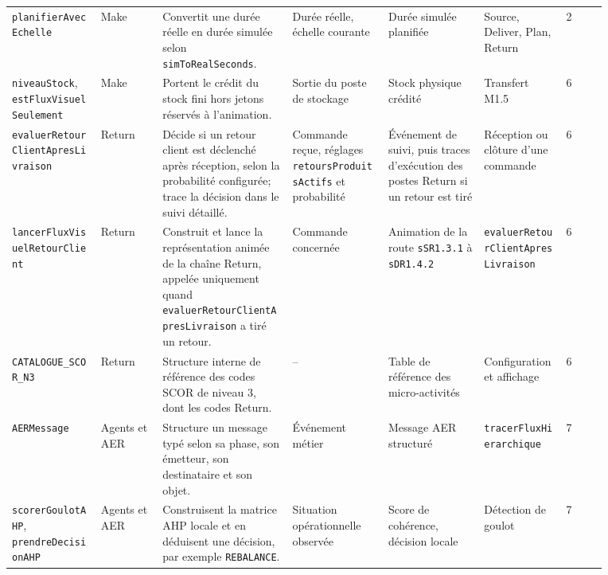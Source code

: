 \begin{landscape}
{\begin{longtable}{L{0.13\linewidth} L{0.09\linewidth} L{0.19\linewidth} L{0.14\linewidth} L{0.14\linewidth} L{0.12\linewidth} L{0.06\linewidth}}
\texttt{planifier\allowbreak Avec\allowbreak Echelle} & Make & Convertit une durée réelle en durée simulée selon \texttt{sim\allowbreak To\allowbreak Real\allowbreak Seconds}. & Durée réelle, échelle courante & Durée simulée planifiée & Source, Deliver, Plan, Return & 2 \\
\texttt{niveau\allowbreak Stock}, \texttt{est\allowbreak Flux\allowbreak Visuel\allowbreak Seulement} & Make & Portent le crédit du stock fini hors jetons réservés à l'animation. & Sortie du poste de stockage & Stock physique crédité & Transfert M1.5 & 6 \\

\texttt{evaluer\allowbreak Retour\allowbreak Client\allowbreak Apres\allowbreak Livraison} & Return & Décide si un retour client est déclenché après réception, selon la probabilité configurée; trace la décision dans le suivi détaillé. & Commande reçue, réglages \texttt{retours\allowbreak Produits\allowbreak Actifs} et probabilité & Événement de suivi, puis traces d'exécution des postes Return si un retour est tiré & Réception ou clôture d'une commande & 6 \\
\texttt{lancer\allowbreak Flux\allowbreak Visuel\allowbreak Retour\allowbreak Client} & Return & Construit et lance la représentation animée de la chaîne Return, appelée uniquement quand \texttt{evaluer\allowbreak Retour\allowbreak Client\allowbreak Apres\allowbreak Livraison} a tiré un retour. & Commande concernée & Animation de la route \texttt{sSR1.3.1} à \texttt{sDR1.4.2} & \texttt{evaluer\allowbreak Retour\allowbreak Client\allowbreak Apres\allowbreak Livraison} & 6 \\
\texttt{CATALOGUE\_\allowbreak SCOR\_\allowbreak N3} & Return & Structure interne de référence des codes SCOR de niveau 3, dont les codes Return. & -- & Table de référence des micro-activités & Configuration et affichage & 6 \\

\texttt{AERMessage} & Agents et AER & Structure un message typé selon sa phase, son émetteur, son destinataire et son objet. & Événement métier & Message AER structuré & \texttt{tracer\allowbreak Flux\allowbreak Hierarchique} & 7 \\
\texttt{scorer\allowbreak Goulot\allowbreak AHP}, \texttt{prendre\allowbreak Decision\allowbreak AHP} & Agents et AER & Construisent la matrice AHP locale et en déduisent une décision, par exemple \texttt{REBALANCE}. & Situation opérationnelle observée & Score de cohérence, décision locale & Détection de goulot & 7 \\


\end{longtable}}
\end{landscape}
